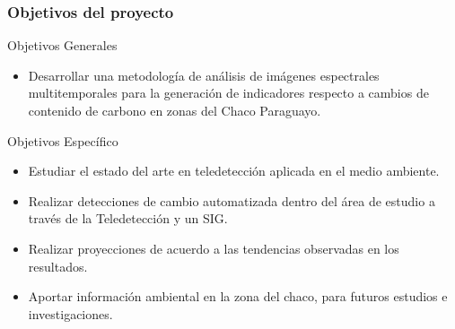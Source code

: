 \documentclass[xcolor=table]{beamer}
\begin{document}
\begin{frame}
	\frametitle{Objetivos del proyecto}
	\begin{block}{Objetivos Generales}
		\begin{itemize}
			\item Desarrollar una metodolog\'ia de an\'alisis de im\'agenes espectrales multitemporales para la generaci\'on de indicadores  respecto a cambios de contenido de carbono en zonas del Chaco Paraguayo.
		\end{itemize}
	\end{block}
	\begin{block}{Objetivos Espec\'ifico}
		\begin{itemize}
			\item Estudiar el estado del arte en teledetecci\'on aplicada en el medio ambiente.
			\item Realizar detecciones de cambio automatizada dentro del \'area de estudio a trav\'es de la Teledetecci\'on y un SIG.
			\item Realizar	proyecciones de acuerdo a las tendencias observadas en los resultados.
			\item Aportar 	informaci\'on ambiental en la zona del chaco, para futuros estudios e investigaciones.
		\end{itemize}
	\end{block}
	
\end{frame}
\end{document}
